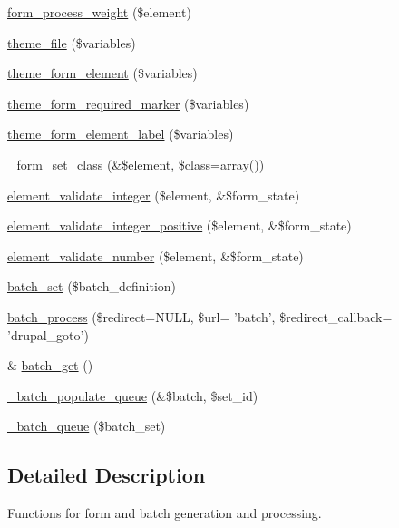 \begin{DoxyCompactItemize}
\hyperlink{group__form__api_ga8d816602aa24f851579022bb37feac42}{form\_\-process\_\-weight} (\$element)
\item 
\hyperlink{group__themeable_ga4c1b5b57f578c1441e27f53733074af8}{theme\_\-file} (\$variables)
\item 
\hyperlink{group__themeable_gafa399c53da3c042edf3863f222d036aa}{theme\_\-form\_\-element} (\$variables)
\item 
\hyperlink{group__themeable_gaa83136018b3c3b40bacae97fe3abcb17}{theme\_\-form\_\-required\_\-marker} (\$variables)
\item 
\hyperlink{group__themeable_gaf3ba527e41db52bfb82c3fc42207540d}{theme\_\-form\_\-element\_\-label} (\$variables)
\item 
\hyperlink{group__form__api_gac8800bdf25db7c100ccf2fd0dcbb25f0}{\_\-form\_\-set\_\-class} (\&\$element, \$class=array())
\item 
\hyperlink{group__form__api_ga6fffa62178c1fc94329e142b083e9b1c}{element\_\-validate\_\-integer} (\$element, \&\$form\_\-state)
\item 
\hyperlink{group__form__api_gad8feb4fd6d8404783042cde1146f53cf}{element\_\-validate\_\-integer\_\-positive} (\$element, \&\$form\_\-state)
\item 
\hyperlink{group__form__api_ga64f40a7bf432284ba5b15021445abd86}{element\_\-validate\_\-number} (\$element, \&\$form\_\-state)
\item 
\hyperlink{group__batch_ga9ff3f18b3bdd1d62ab7ac681a22a7170}{batch\_\-set} (\$batch\_\-definition)
\item 
\hyperlink{group__batch_gab17f59692632a482cee4f65f27d082f7}{batch\_\-process} (\$redirect=NULL, \$url= 'batch', \$redirect\_\-callback= 'drupal\_\-goto')
\item 
\& \hyperlink{group__batch_ga971f5246c6e8e536d0b20529fb2e2638}{batch\_\-get} ()
\item 
\hyperlink{group__batch_gaac34897148f5ea89ce15f4f95c34557e}{\_\-batch\_\-populate\_\-queue} (\&\$batch, \$set\_\-id)
\item 
\hyperlink{group__batch_ga93c80df7641ba3be8bc535a9c1fd13c2}{\_\-batch\_\-queue} (\$batch\_\-set)
\end{DoxyCompactItemize}


\subsection{Detailed Description}
Functions for form and batch generation and processing. 